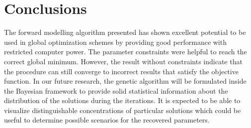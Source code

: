 \documentclass{vie16}
\begin{document}
\section{Conclusions}
The forward modelling algorithm presented has shown excellent
potential to be used in global optimization schemes by providing
good performance with restricted computer power. The parameter constraints
were helpful to reach the correct global minimum. However, the
result without constraints indicate that the procedure can still converge
to incorrect results that satisfy the objective function. In our
future research, the genetic algorithm will be formulated inside
the Bayesian framework to provide solid statistical information
about the distribution of the solutions during the iterations.
It is expected to be able to visualize distinguishable
concentrations of particular solutions which could be useful to
determine possible scenarios for the recovered parameters.
\end{document}
